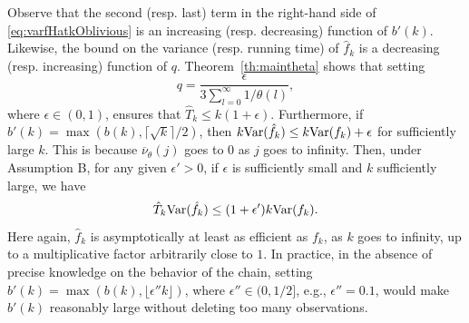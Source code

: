 \documentclass[a4paper,11pt]{article}
\begin{document}
Observe that the second (resp. last) term in the right-hand side of  \eqref{eq:varfHatkOblivious} is an increasing (resp. decreasing) function of \(b'(k)\). Likewise,   the bound on the variance (resp. running time) of  \(\hat f_{k}\)  is a decreasing (resp. increasing) function of \(q\). 
Theorem~\ref{th:maintheta} shows that setting
\begin{equation*}q=\frac{\epsilon}{3\sum^{\infty}_{l=0}1/\theta(l)}, 
\end{equation*} where \(\epsilon\in(0,1)\),  ensures that \(\hat T_{k}\le k(1+\epsilon)\). Furthermore,  if \(b'(k)=\max(b(k),\lceil\sqrt{k}\rceil/2)\), then \(k{\rm Var}(\hat f_{k})\leq k{\rm Var}(f_{k})+\epsilon\) for sufficiently large \(k\). This is because \(\overline{\nu}_{\theta}(j)\) goes to \(0\) as \(j\) goes to infinity.
 Then,  under Assumption B, for any given \(\epsilon'>0\), if \(\epsilon\) is sufficiently small and \(k\) sufficiently large, we have\begin{equation*}
\hat T_{k}{\rm Var}(\hat f_{k})\leq (1+\epsilon')k{\rm Var}(f_{k}).
\end{equation*} Here again, \(\hat f_{k}\) is asymptotically at least as efficient as  \(f_{k}\), as \(k\) goes to infinity,  up to a multiplicative factor arbitrarily close to \(1\). In practice, in the absence of precise knowledge on the behavior of the chain, setting \(b'(k)=\max(b(k),\lfloor \epsilon''k\rfloor)\), where \(\epsilon''\in(0,1/2]\), e.g., \(\epsilon''=0.1\), would make \(b'(k)\) reasonably large without deleting too many observations.
    
\end{document}
